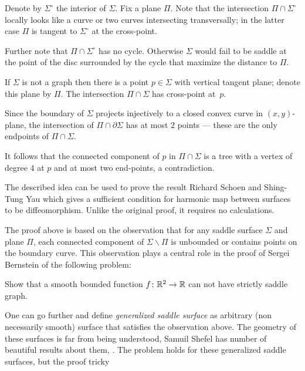 Denote by $\Sigma^\circ$ the interior of $\Sigma$.
Fix a plane $\Pi$. 
Note that the intersection $\Pi\cap \Sigma^\circ$ 
locally  looks like a curve or two curves intersecting transversally;
in the latter case $\Pi$ is tangent to $\Sigma^\circ$ at the cross-point.

Further note that $\Pi\cap \Sigma^\circ$ has no cycle.
Otherwise $\Sigma$ would fail to be saddle at the point of the disc surrounded by the cycle that maximize the distance to $\Pi$.

If $\Sigma$ is not a graph then there is a point $p\in\Sigma$ with vertical tangent plane;
denote this plane by $\Pi$.
The intersection $\Pi\cap\Sigma$ has cross-point at~$p$.

Since the boundary of $\Sigma$ projects injectively to a closed convex curve in $(x,y)$-plane,
the intersection of $\Pi\cap\partial \Sigma$ has at most 2 points --- these are the only endpoints of $\Pi\cap\Sigma$.

It follows that the connected component of $p$ in $\Pi\cap\Sigma$ is a tree 
with a vertex of degree 4 at $p$ and at most two end-points, a contradiction.\qeds

The described idea can be used to prove the result Richard Schoen and Shing-Tung  Yau \cite[see][]{schoen-yau-2D} which gives a sufficient condition for harmonic map between surfaces to be diffeomorphism.
Unlike the original proof, it requires no calculations.

The proof above is based on the observation 
that for any saddle surface $\Sigma$ and plane $\Pi$,
each connected component of $\Sigma\backslash \Pi$ is unbounded or contains points on the boundary curve.
This observation plays a central role in the proof of Sergei Bernstein \cite[see][]{bernshtein}
of the following problem:

\begin{pr}
Show that a smooth bounded function $f\colon\mathbb{R}^2\to\mathbb{R}$ can not have strictly saddle graph.
\end{pr}

One can go further and define \emph{generalized saddle surface} as arbitrary (non necessarily smooth) surface that satisfies the observation above.
The geometry of these surfaces is far from being understood,
Samuil Shefel has number of beautiful results about them, 
\cite[see][and the references there in]{shefel, AKP-invitation}.
The problem holds for these generalized saddle surfaces, but
the proof tricky \cite[see][]{petrunin-stadler}


